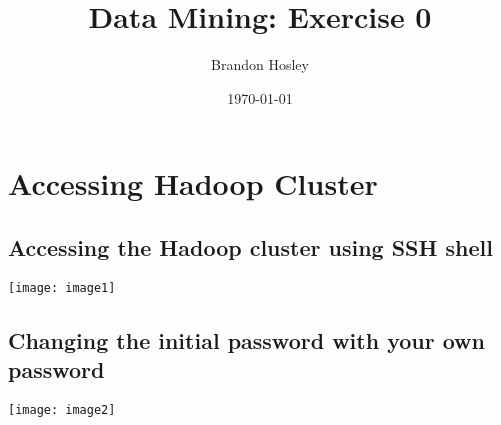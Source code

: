 \documentclass[]{article}
\title{Data Mining: Exercise 0}
\author{Brandon Hosley}
\date{\today}
\begin{document}
\maketitle

\section{Accessing Hadoop Cluster}
\subsection{Accessing the Hadoop cluster using SSH shell}
	\texttt{[image: image1]}
\subsection{Changing the initial password with your own password}
	\texttt{[image: image2]}
\end{document}
